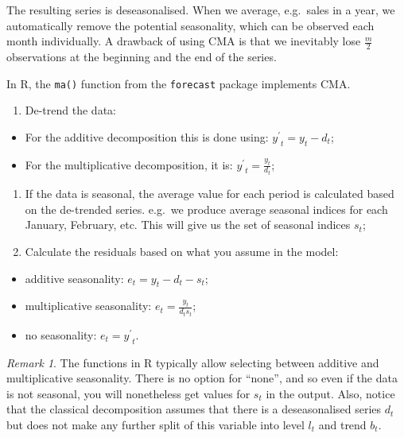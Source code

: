 \documentclass[
]{book}
\providecommand{\tightlist}{%
  \setlength{\itemsep}{0pt}\setlength{\parskip}{0pt}}
\theoremstyle{definition}
\theoremstyle{definition}
\theoremstyle{definition}
\theoremstyle{definition}
\theoremstyle{remark}
\newtheorem*{remark}{Remark}
\begin{document}
The resulting series is deseasonalised. When we average, e.g.~sales in a year, we automatically remove the potential seasonality, which can be observed each month individually. A drawback of using CMA is that we inevitably lose \(\frac{m}{2}\) observations at the beginning and the end of the series.

In R, the \texttt{ma()} function from the \texttt{forecast} package implements CMA.

\begin{enumerate}
\def\labelenumi{\arabic{enumi}.}
\setcounter{enumi}{2}
\tightlist
\item
  De-trend the data:
\end{enumerate}

\begin{itemize}
\tightlist
\item
  For the additive decomposition this is done using: \({y^\prime}_t = y_t -d_t\);
\item
  For the multiplicative decomposition, it is: \({y^\prime}_t = \frac{y_t}{d_t}\);
\end{itemize}

\begin{enumerate}
\def\labelenumi{\arabic{enumi}.}
\setcounter{enumi}{3}
\tightlist
\item
  If the data is seasonal, the average value for each period is calculated based on the de-trended series. e.g.~we produce average seasonal indices for each January, February, etc. This will give us the set of seasonal indices \(s_t\);
\item
  Calculate the residuals based on what you assume in the model:
\end{enumerate}

\begin{itemize}
\tightlist
\item
  additive seasonality: \(e_t = y_t -d_t -s_t\);
\item
  multiplicative seasonality: \(e_t = \frac{y_t}{d_t s_t}\);
\item
  no seasonality: \(e_t = {y^\prime}_t\).
\end{itemize}

\begin{remark}
The functions in R typically allow selecting between additive and multiplicative seasonality. There is no option for ``none'', and so even if the data is not seasonal, you will nonetheless get values for \(s_t\) in the output. Also, notice that the classical decomposition assumes that there is a deseasonalised series \(d_t\) but does not make any further split of this variable into level \(l_t\) and trend \(b_t\).
\end{remark}
\end{document}
